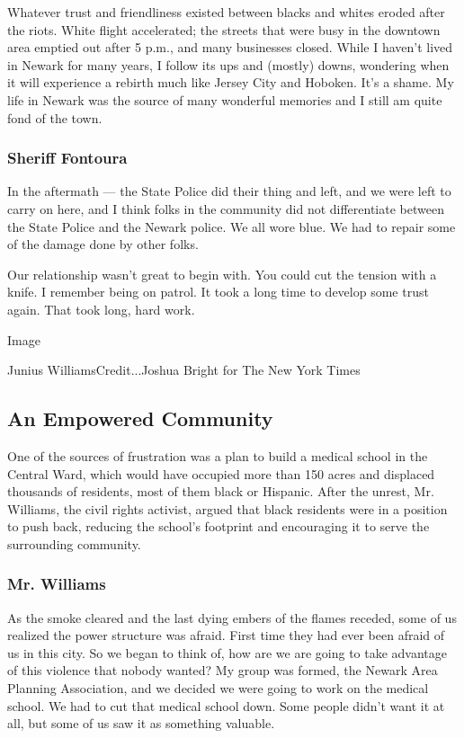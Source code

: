 Whatever trust and friendliness existed between blacks and whites eroded
after the riots. White flight accelerated; the streets that were busy in
the downtown area emptied out after 5 p.m., and many businesses closed.
While I haven't lived in Newark for many years, I follow its ups and
(mostly) downs, wondering when it will experience a rebirth much like
Jersey City and Hoboken. It's a shame. My life in Newark was the source
of many wonderful memories and I still am quite fond of the town. ~

\hypertarget{sheriff-fontoura}{%
\subsubsection{Sheriff Fontoura}\label{sheriff-fontoura}}

In the aftermath --- the State Police did their thing and left, and we
were left to carry on here, and I think folks in the community did not
differentiate between the State Police and the Newark police. We all
wore blue. We had to repair some of the damage done by other folks.~

Our relationship wasn't great to begin with. You could cut the tension
with a knife. I remember being on patrol. It took a long time to develop
some trust again. That took long, hard work.

Image

Junius WilliamsCredit...Joshua Bright for The New York Times

\hypertarget{an-empowered-community}{%
\subsection{An Empowered Community}\label{an-empowered-community}}

One of the sources of frustration was a plan to build a medical school
in the Central Ward, which would have occupied more than 150 acres and
displaced thousands of residents, most of them black or Hispanic. After
the unrest, Mr. Williams, the civil rights activist, argued that black
residents were in a position to push back, reducing the school's
footprint and encouraging it to serve the surrounding community.

\hypertarget{mr-williams}{%
\subsubsection{Mr. Williams}\label{mr-williams}}

As the smoke cleared and the last dying embers of the flames receded,
some of us realized the power structure was afraid. First time they had
ever been afraid of us in this city. So we began to think of, how are we
are going to take advantage of this violence that nobody wanted? My
group was formed, the Newark Area Planning Association, and we decided
we were going to work on the medical school. We had to cut that medical
school down. Some people didn't want it at all, but some of us saw it as
something valuable.


